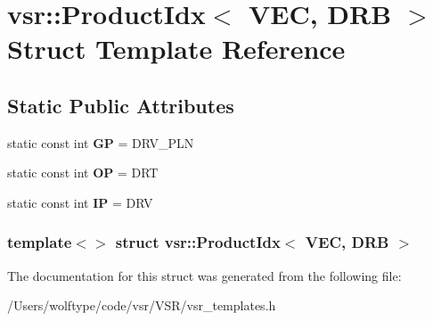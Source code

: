 \hypertarget{structvsr_1_1_product_idx_3_01_v_e_c_00_01_d_r_b_01_4}{\section{vsr\-:\-:Product\-Idx$<$ V\-E\-C, D\-R\-B $>$ Struct Template Reference}
\label{structvsr_1_1_product_idx_3_01_v_e_c_00_01_d_r_b_01_4}
}
\subsection*{Static Public Attributes}
\begin{DoxyCompactItemize}
\item 
\hypertarget{structvsr_1_1_product_idx_3_01_v_e_c_00_01_d_r_b_01_4_a87abbca157242673fcbedc173cd04506}{static const int {\bfseries G\-P} = D\-R\-V\-\_\-\-P\-L\-N}\label{structvsr_1_1_product_idx_3_01_v_e_c_00_01_d_r_b_01_4_a87abbca157242673fcbedc173cd04506}

\item 
\hypertarget{structvsr_1_1_product_idx_3_01_v_e_c_00_01_d_r_b_01_4_aa8e8a620f65ddb70b2fe54b43279de36}{static const int {\bfseries O\-P} = D\-R\-T}\label{structvsr_1_1_product_idx_3_01_v_e_c_00_01_d_r_b_01_4_aa8e8a620f65ddb70b2fe54b43279de36}

\item 
\hypertarget{structvsr_1_1_product_idx_3_01_v_e_c_00_01_d_r_b_01_4_ad04d088a0f4665e5a0d4b4579fe582b5}{static const int {\bfseries I\-P} = D\-R\-V}\label{structvsr_1_1_product_idx_3_01_v_e_c_00_01_d_r_b_01_4_ad04d088a0f4665e5a0d4b4579fe582b5}

\end{DoxyCompactItemize}
\subsubsection*{template$<$$>$ struct vsr\-::\-Product\-Idx$<$ V\-E\-C, D\-R\-B $>$}



The documentation for this struct was generated from the following file\-:\begin{DoxyCompactItemize}
\item 
/\-Users/wolftype/code/vsr/\-V\-S\-R/vsr\-\_\-templates.\-h\end{DoxyCompactItemize}

